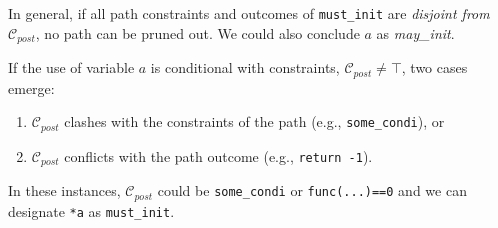 In general, if all path constraints and outcomes of \texttt{must\_init} are \textit{disjoint from} \(\mathcal{C}_{post}\),
no path can be pruned out. We could also conclude \(a\) as \textit{may\_init}.
\item If the use of variable \(a\) is conditional with constraints, \ie \(\mathcal{C}_{post}\neq\top\), two cases emerge:
\begin{enumerate}
\item \(\mathcal{C}_{post}\) clashes with the constraints of the path (e.g., \texttt{some\_condi}), or
\item \(\mathcal{C}_{post}\) conflicts with the path outcome (e.g., \texttt{return -1}).
\end{enumerate}
In these instances, \(\mathcal{C}_{post}\) could be \texttt{some\_condi} or \texttt{func(...)==0} and we can designate \texttt{*a} as \texttt{must\_init}. 
\squishend












